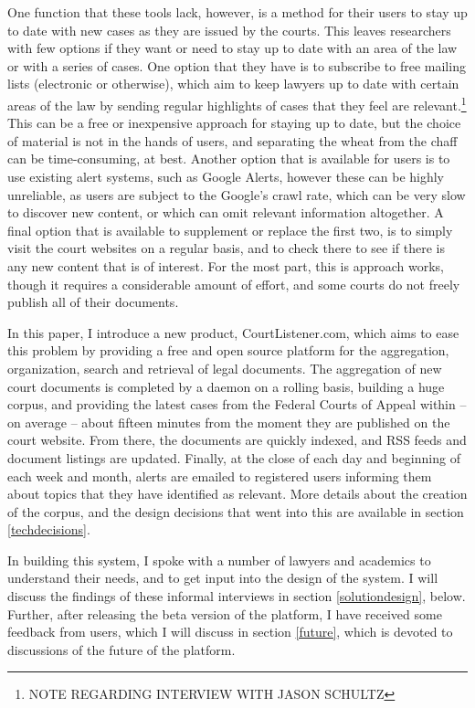 One function that these tools lack, however, is a method for their users to stay up to date with new cases as they are issued by the courts. This leaves researchers with few options if they want or need to stay up to date with an area of the law or with a series of cases. One option that they have is to subscribe to free mailing lists (electronic or otherwise), which aim to keep lawyers up to date with certain areas of the law by sending regular highlights of cases that they feel are relevant.\footnote{NOTE REGARDING INTERVIEW WITH JASON SCHULTZ} This can be a free or inexpensive approach for staying up to date, but the choice of material is not in the hands of users, and separating the wheat from the chaff can be time-consuming, at best. Another option that is available for users is to use existing alert systems, such as Google Alerts, however these can be highly unreliable, as users are subject to the Google's crawl rate, which can be very slow to discover new content, or which can omit relevant information altogether. A final option that is available to supplement or replace the first two, is to simply visit the court websites on a regular basis, and to check there to see if there is any new content that is of interest. For the most part, this is approach works, though it requires a considerable amount of effort, and some courts do not freely publish all of their documents.

In this paper, I introduce a new product, CourtListener.com, which aims to ease this problem by providing a free and open source platform for the aggregation, organization, search and retrieval of legal documents. The aggregation of new court documents is completed by a daemon on a rolling basis, building a huge corpus, and providing the latest cases from the Federal Courts of Appeal within -- on average -- about fifteen minutes from the moment they are published on the court website. From there, the documents are quickly indexed, and RSS feeds and document listings are updated. Finally, at the close of each day and beginning of each week and month, alerts are emailed to registered users informing them about topics that they have identified as relevant. More details about the creation of the corpus, and the design decisions that went into this are available in section \ref{techdecisions}.

In building this system, I spoke with a number of lawyers and academics to understand their needs, and to get input into the design of the system. I will discuss the findings of these informal interviews in section \ref{solutiondesign}, below. Further, after releasing the beta version of the platform, I have received some feedback from users, which I will discuss in section \ref{future}, which is devoted to discussions of the future of the platform.


